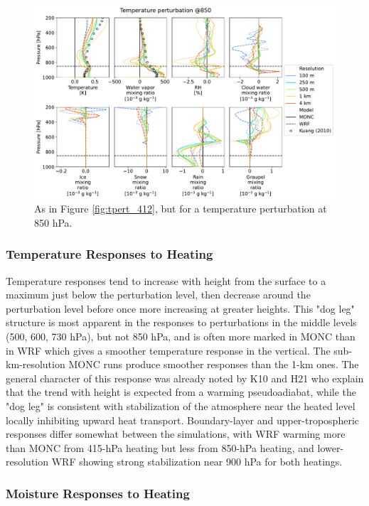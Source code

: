 \documentclass[draft]{agujournal2019}
\begin{document}
\begin{figure}[pth]
    \noindent\includegraphics[width=\textwidth]{figures/pert_diffs_T_0.5_@850}
    \caption{As in Figure \ref{fig:tpert_412}, but for a temperature
    perturbation at 850 hPa.}
    \label{fig:tpert_850}
\end{figure}

\subsubsection{Temperature Responses to Heating}

Temperature responses tend to increase with height from the surface to a maximum
just below the perturbation level, then decrease around the perturbation level
before once more increasing at greater heights. This "dog leg" structure is most
apparent in the responses to perturbations in the middle levels (500, 600, 730
hPa), but not 850 hPa, and is often more marked in MONC than in WRF which gives
a smoother temperature response in the vertical. The sub-km-resolution MONC runs
produce smoother responses than the 1-km ones. The general character of this
response was already noted by K10 and H21 who explain that the trend with height
is expected from a warming pseudoadiabat, while the "dog leg" is consistent with
stabilization of the atmosphere near the heated level locally inhibiting upward
heat transport. Boundary-layer and upper-tropospheric responses differ somewhat
between the simulations, with WRF warming more than MONC from 415-hPa heating
but less from 850-hPa heating, and lower-resolution WRF showing strong
stabilization near 900 hPa for both heatings.

\subsubsection{Moisture Responses to Heating}
\end{document}
